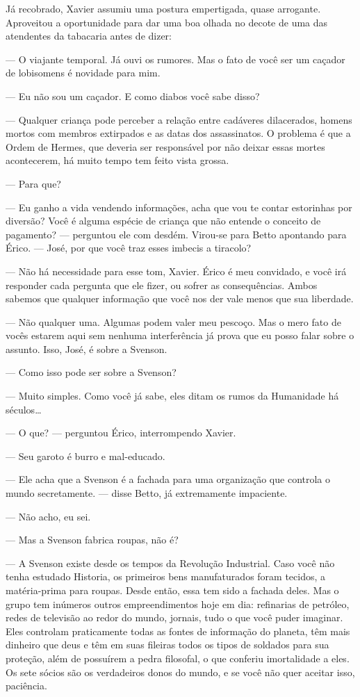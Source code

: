 Já recobrado, Xavier assumiu uma postura empertigada, quase arrogante. Aproveitou a oportunidade para dar uma boa olhada no decote de uma das atendentes da tabacaria antes de dizer:

--- O viajante temporal. Já ouvi os rumores. Mas o fato de você ser um caçador de lobisomens é novidade para mim.

--- Eu não sou um caçador. E como diabos você sabe disso?

--- Qualquer criança pode perceber a relação entre cadáveres dilacerados, homens mortos com membros extirpados e as datas dos assassinatos. O problema é que a Ordem de Hermes, que deveria ser responsável por não deixar essas mortes acontecerem, há muito tempo tem feito vista grossa.

--- Para que?

--- Eu ganho a vida vendendo informações, acha que vou te contar estorinhas por diversão? Você é alguma espécie de criança que não entende o conceito de pagamento? --- perguntou ele com desdém. Virou-se para Betto apontando para Érico. --- José, por que você traz esses imbecis a tiracolo?

--- Não há necessidade para esse tom, Xavier. Érico é meu convidado, e você irá responder cada pergunta que ele fizer, ou sofrer as consequências. Ambos sabemos que qualquer informação que você nos der vale menos que sua liberdade.

--- Não qualquer uma. Algumas podem valer meu pescoço. Mas o mero fato de vocês estarem aqui sem nenhuma interferência já prova que eu posso falar sobre o assunto. Isso, José, é sobre a Svenson.

--- Como isso pode ser sobre a Svenson?

--- Muito simples. Como você já sabe, eles ditam os rumos da Humanidade há séculos\ldots

--- O que? --- perguntou Érico, interrompendo Xavier.

--- Seu garoto é burro e mal-educado.

--- Ele acha que a Svenson é a fachada para uma organização que controla o mundo secretamente. --- disse Betto, já extremamente impaciente.

--- Não acho, eu sei.

--- Mas a Svenson fabrica roupas, não é?

--- A Svenson existe desde os tempos da Revolução Industrial. Caso você não tenha estudado Historia, os primeiros bens manufaturados foram tecidos, a matéria-prima para roupas. Desde então, essa tem sido a fachada deles. Mas o grupo tem inúmeros outros empreendimentos hoje em dia: refinarias de petróleo, redes de televisão ao redor do mundo, jornais, tudo o que você puder imaginar. Eles controlam praticamente todas as fontes de informação do planeta, têm mais dinheiro que deus e têm em suas fileiras todos os tipos de soldados para sua proteção, além de possuírem a pedra filosofal, o que conferiu imortalidade a eles. Os sete sócios são os verdadeiros donos do mundo, e se você não quer aceitar isso, paciência.

